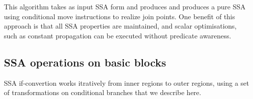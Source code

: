 This algorithm takes as input SSA form and produces and produces a pure SSA using conditional move instructions to realize join points. One benefit of this approach is that all SSA properties are maintained, and scalar optimisations, such as constant propagation can be executed without predicate awareness.

\subsection{SSA operations on basic blocks}

SSA if-convertion works itratively from inner regions to outer regions, using a set of transformations on conditional branches that we describe here.

\begin{figure}
\label{fig: phi_operations}
\end{figure}


